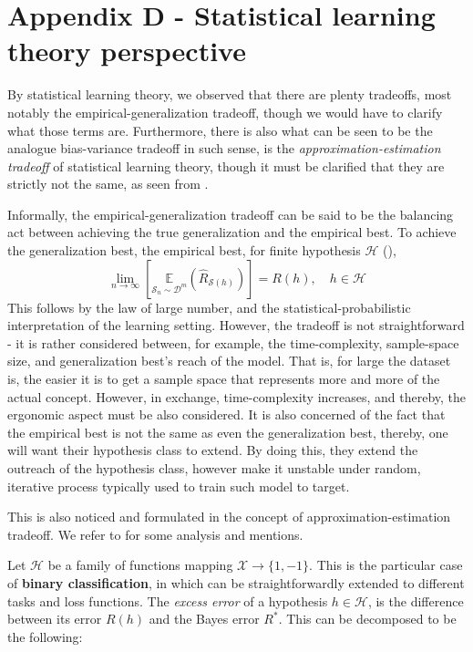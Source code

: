 \documentclass[10pt]{article} %
\begin{document}
\section*{Appendix D - Statistical learning theory perspective}

By statistical learning theory, we observed that there are plenty tradeoffs, most notably the empirical-generalization tradeoff, though we would have to clarify what those terms are. Furthermore, there is also what can be seen to be the analogue bias-variance tradeoff in such sense, is the \textit{approximation-estimation tradeoff} of statistical learning theory, though it must be clarified that they are strictly not the same, as seen from \cite{brown2024biasvariance}. 

Informally, the empirical-generalization tradeoff can be said to be the balancing act between achieving the true generalization and the empirical best. To achieve the generalization best, the empirical best, for finite hypothesis $\mathcal{H}$ (\cite{10.5555/2371238}), 
\begin{equation}
  \lim_{n\to \infty} \left[\underset{\mathcal{S}_{n}\sim \mathcal{D}^{m}}{\mathbb{E}}(\hat{R}_{\mathcal{S}(h)})\right]  = R(h), \quad h\in \mathcal{H}
\end{equation} 
This follows by the law of large number, and the statistical-probabilistic interpretation of the learning setting. However, the tradeoff is not straightforward - it is rather considered between, for example, the time-complexity, sample-space size, and generalization best's reach of the model. That is, for large the dataset is, the easier it is to get a sample space that represents more and more of the actual concept. However, in exchange, time-complexity increases, and thereby, the ergonomic aspect must be also considered. It is also concerned of the fact that the empirical best is not the same as even the generalization best, thereby, one will want their hypothesis class to extend. By doing this, they extend the outreach of the hypothesis class, however make it unstable under random, iterative process typically used to train such model to target. 

This is also noticed and formulated in the concept of approximation-estimation tradeoff. We refer to \cite{10.5555/2371238,lafon_understanding_2024} for some analysis and mentions. 

Let $\mathcal{H}$ be a family of functions mapping $\mathcal{X}\to\{1,-1\}$. This is the particular case of \textbf{binary classification}, in which can be straightforwardly extended to different tasks and loss functions. The \textit{excess error} of a hypothesis $h\in\mathcal{H}$, is the difference between its error $R(h)$ and the Bayes error $R^{*}$. This can be decomposed to be the following: 
\end{document}
